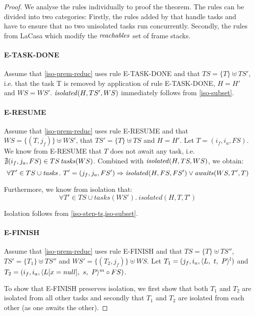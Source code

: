 \begin{proof}
We analyse the rules individually to proof the theorem. The rules can be divided into two categories: Firstly, the rules added by \plc that handle tasks and have to ensure that no two unisolated tasks run concurrently. Secondly, the rules from LaCasa which modify the $\mathop{\mathit{reachables}}$ set of frame stacks.

\paragraph{E-TASK-DONE}
Assume that \cref{iso-prem-reduc} uses rule E-TASK-DONE and that $TS = \{T\} \uplus TS'$, i.e. that the task T is removed by application of rule E-TASK-DONE, $H = H'$ and $WS = WS'$. $\mathop{\mathit{isolated}}(H, TS', WS)$ immediately follows from \cref{iso-subset}.

\paragraph{E-RESUME}
Assume that \cref{iso-prem-reduc} uses rule E-RESUME and that $WS = \{ (T, j_f) \} \uplus WS'$, that $TS' = \{ T \} \uplus TS$ and $H = H'$. Let $T = (i_f, i_a, FS)$. We know from E-RESUME that $T$ does not await any task, i.e. $\nexists(i_f, j_a, FS) \in TS \mathop{\mathit{tasks}}(WS)$. Combined with $\mathop{\mathit{isolated}}(H, TS, WS)$, we obtain:
\[
    \forall T' \in TS \cup \mathop{\mathit{tasks}}.\ T' = (j_f, j_a, FS') \Rightarrow \mathop{\mathit{isolated}}(H, FS, FS') \vee \mathop{\mathit{awaits}}(WS, T', T)
\]

Furthermore, we know from isolation that:
\[
    \forall T' \in TS \cup tasks(WS').\ isolated(H, T, T')
\]

Isolation follows from \cref{iso-step-ts,iso-subset}.

\paragraph{E-FINISH}
Assume that \cref{iso-prem-reduc} uses rule E-FINISH and that $TS = \{ T \} \uplus TS''$, $TS' = \{ T_1 \} \uplus TS''$ and $WS' = \{(T_2, j_f)\} \uplus WS$. Let $T_1 = (j_f, i_a, \sframe{t})$ and $T_2 = (i_f, i_a, \sframe[L[x = null]]{s}[P][m] \circ FS)$.

To show that E-FINISH preserves isolation, we first show that both $T_1$ and $T_2$ are isolated from all other tasks and secondly that $T_1$ and $T_2$ are isolated from each other (as one awaits the other).


\end{proof}
